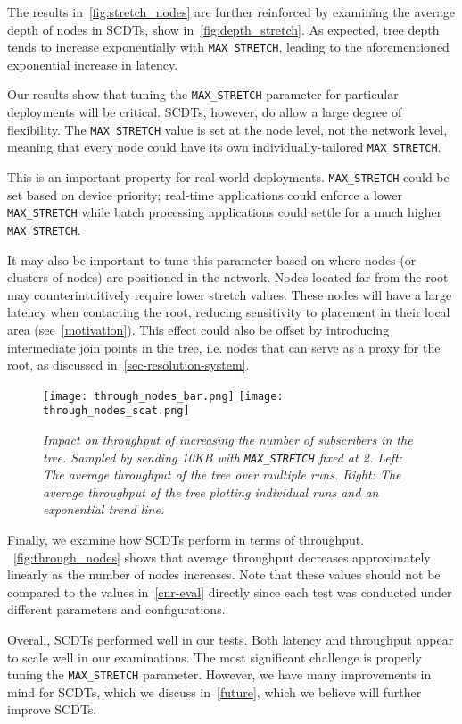 The results in~\autoref{fig:stretch_nodes} are further reinforced by examining the average depth of nodes in SCDTs, show in~\autoref{fig:depth_stretch}. As expected, tree depth tends to increase exponentially with \texttt{MAX\_STRETCH}, leading to the aforementioned exponential increase in latency.

Our results show that tuning the \texttt{MAX\_STRETCH} parameter for particular deployments will be critical. SCDTs, however, do allow a large degree of flexibility. The \texttt{MAX\_STRETCH} value is set at the node level, not the network level, meaning that every node could have its own individually-tailored \texttt{MAX\_STRETCH}.

This is an important property for real-world deployments. \texttt{MAX\_STRETCH} could be set based on device priority; real-time applications could enforce a lower \texttt{MAX\_STRETCH} while batch processing applications could settle for a much higher \texttt{MAX\_STRETCH}.  

It may also be important to tune this parameter based on where nodes (or clusters of nodes) are positioned in the network. Nodes located far from the root may counterintuitively require lower stretch values. These nodes will have a large latency when contacting the root, reducing sensitivity to placement in their local area (see~\autoref{motivation}). This effect could also be offset by introducing intermediate join points in the tree, i.e. nodes that can serve as a proxy for the root, as discussed in~\autoref{sec-resolution-system}.
	
\begin{figure}[h]
	\begin{center}
		\texttt{[image: through\_nodes\_bar.png]}
		\texttt{[image: through\_nodes\_scat.png]}
	\end{center}
	\vspace{-1.3em}
	\caption{\small \itshape Impact on throughput of increasing the number of subscribers in the tree. Sampled by sending 10KB with \texttt{MAX\_STRETCH} fixed at 2. Left: The average throughput of the tree over multiple runs. Right: The average throughput of the tree plotting individual runs and an exponential trend line.}
	\vspace{-1em}
	\label{fig:through_nodes}
\end{figure}

Finally, we examine how SCDTs perform in terms of throughput. ~\autoref{fig:through_nodes} shows that average throughput decreases approximately linearly as the number of nodes increases. Note that these values should not be compared to the values in~\autoref{cnr-eval} directly since each test was conducted under different parameters and configurations.  

Overall, SCDTs performed well in our tests. Both latency and throughput appear to scale well in our examinations. The most significant challenge is properly tuning the \texttt{MAX\_STRETCH} parameter. However, we have many improvements in mind for SCDTs, which we discuss in~\autoref{future}, which we believe will further improve SCDTs. 